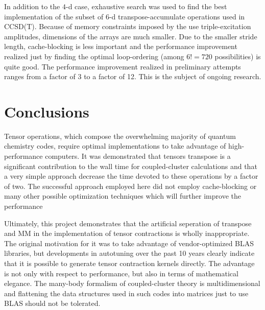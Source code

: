 \documentclass[letterpaper,12pt]{article}
\begin{document}
In addition to the $4$-d case, exhaustive search was used to find the best implementation of the subset of $6$-d transpose-accumulate operations used in CCSD(T).  Because of memory constraints imposed by the use triple-excitation amplitudes, dimensions of the arrays are much smaller.  Due to the smaller stride length, cache-blocking is less important and the performance improvement realized just by finding the optimal loop-ordering (among $6!=720$ possibilities) is quite good.  The performance improvement realized in preliminary attempts ranges from a factor of 3 to a factor of 12.  This is the subject of ongoing research.

\section{Conclusions}

Tensor operations, which compose the overwhelming majority of quantum chemistry codes, require optimal implementations to take advantage of high-performance computers.  It was demonstrated that tensors transpose is a significant contribution to the wall time for coupled-cluster calculations and that a very simple approach decrease the time devoted to these operations by a factor of two.  The successful approach employed here did not employ cache-blocking or many other possible optimization techniques which will further improve the performance

Ultimately, this project demonstrates that the artificial seperation of transpose and MM in the implementation of tensor contractions is wholly inappropriate.  The original motivation for it was to take advantage of vendor-optimized BLAS libraries, but developments in autotuning over the past 10 years clearly indicate that it is possible to generate tensor contraction kernels directly.  The advantage is not only with respect to performance, but also in terms of mathematical elegance.  The many-body formalism of coupled-cluster theory is multidimensional and flattening the data structures used in such codes into matrices just to use BLAS should not be tolerated.
\end{document}

